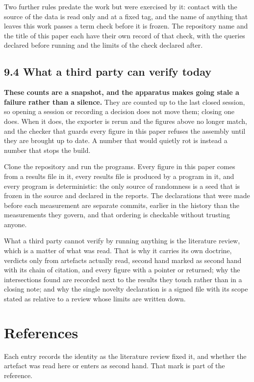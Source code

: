 \documentclass[11pt,a4paper]{article}
\begin{document}
Two further rules predate the work but were exercised by it: contact with the source of the data is read only and at a fixed tag, and the name of anything that leaves this work passes a term check before it is frozen. The repository name and the title of this paper each have their own record of that check, with the queries declared before running and the limits of the check declared after.

\subsection*{9.4 What a third party can verify today}

\textbf{These counts are a snapshot, and the apparatus makes going stale a failure rather than a silence.} They are counted up to the last closed session, so opening a session or recording a decision does not move them; closing one does. When it does, the exporter is rerun and the figures above no longer match, and the checker that guards every figure in this paper refuses the assembly until they are brought up to date. A number that would quietly rot is instead a number that stops the build.

Clone the repository and run the programs. Every figure in this paper comes from a results file in it, every results file is produced by a program in it, and every program is deterministic: the only source of randomness is a seed that is frozen in the source and declared in the reports. The declarations that were made before each measurement are separate commits, earlier in the history than the measurements they govern, and that ordering is checkable without trusting anyone.

What a third party cannot verify by running anything is the literature review, which is a matter of what was read. That is why it carries its own doctrine, verdicts only from artefacts actually read, second hand marked as second hand with its chain of citation, and every figure with a pointer or returned; why the intersections found are recorded next to the results they touch rather than in a closing note; and why the single novelty declaration is a signed file with its scope stated as relative to a review whose limits are written down.

\section*{References}

Each entry records the identity as the literature review fixed it, and whether the artefact was read here or enters as second hand. That mark is part of the reference.
\end{document}
